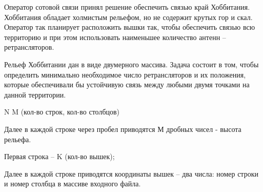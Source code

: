 
Оператор сотовой связи принял решение обеспечить связью край Хоббитания. Хоббитания обладает холмистым рельефом, но не содержит крутых гор и скал. Оператор так планирует расположить вышки так, чтобы обеспечить связью всю территорию и при этом использовать наименьшее количество антенн – ретрансляторов. 

Рельеф Хоббитании дан в виде двумерного массива. Задача состоит в том, чтобы определить минимально необходимое число ретрансляторов и их положения, которые обеспечивали бы устойчивую связь между любыми двумя точками на данной территории.


N M (кол-во строк, кол-во столбцов)

Далее в каждой строке через пробел приводятся М дробных чисел - высота рельефа.

\outputfmtSection

Первая строка – K (кол-во вышек);

Далее в каждой строке приводятся координаты вышек – два числа: номер строки и номер столбца в массиве входного файла.


